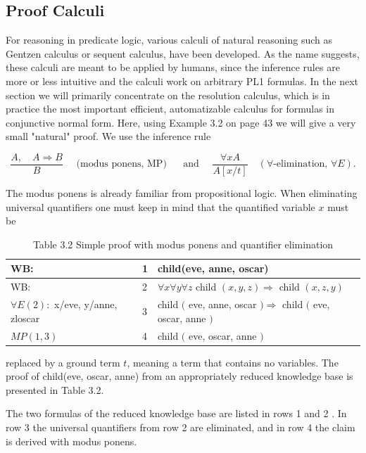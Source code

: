 \documentclass[10pt]{article}
\begin{document}
\subsection*{Proof Calculi}
For reasoning in predicate logic, various calculi of natural reasoning such as Gentzen calculus or sequent calculus, have been developed. As the name suggests, these calculi are meant to be applied by humans, since the inference rules are more or less intuitive and the calculi work on arbitrary PL1 formulas. In the next section we will primarily concentrate on the resolution calculus, which is in practice the most important efficient, automatizable calculus for formulas in conjunctive normal form. Here, using Example 3.2 on page 43 we will give a very small "natural" proof. We use the inference rule

$$
\frac{A, \quad A \Rightarrow B}{B} \quad \text { (modus ponens, MP) } \quad \text { and } \quad \frac{\forall x A}{A[x / t]} \quad(\forall \text {-elimination, } \forall E) .
$$

The modus ponens is already familiar from propositional logic. When eliminating universal quantifiers one must keep in mind that the quantified variable $x$ must be

\begin{table}[h]
\begin{center}
\captionsetup{labelformat=empty}
\caption{Table 3.2 Simple proof with modus ponens and quantifier elimination}
\begin{tabular}{lll}
\hline
WB: & 1 & child(eve, anne, oscar) \\
\hline
WB: & 2 & $\forall x \forall y \forall z$ child $(x, y, z) \Rightarrow$ child $(x, z, y)$ \\
\hline
$\forall E(2):$ x/eve, y/anne, zloscar & 3 & child $($ eve, anne, oscar $) \Rightarrow$ child $($ eve, oscar, anne $)$ \\
\hline
$M P(1,3)$ & 4 & child $($ eve, oscar, anne $)$ \\
\hline
\end{tabular}
\end{center}
\end{table}

replaced by a ground term $t$, meaning a term that contains no variables. The proof of child(eve, oscar, anne) from an appropriately reduced knowledge base is presented in Table 3.2.

The two formulas of the reduced knowledge base are listed in rows 1 and 2 . In row 3 the universal quantifiers from row 2 are eliminated, and in row 4 the claim is derived with modus ponens.
\end{document}
